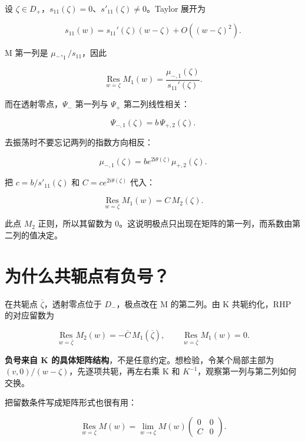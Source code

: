 设 $\zeta{}\in{}D_{+}$，$s_{11}(\zeta{})=0$、$s'_{11}(\zeta{})\ne{}0$。Taylor 展开为\par

\[
s_{11}(w)=s_{11}'(\zeta)(w-\zeta)+O((w-\zeta)^2).
\]

M 第一列是 $\mu{}_{-},_{1}/s_{11}$，因此\par

\[
\operatorname*{Res}_{w=\zeta}M_1(w)
=\dfrac{\mu_{-,1}(\zeta)}{s_{11}'(\zeta)}.
\]

而在透射零点，$\Psi{}_{-}$ 第一列与 $\Psi{}_{+}$ 第二列线性相关：\par

\[
\Psi_{-,1}(\zeta)=b\,\Psi_{+,2}(\zeta).
\]

去振荡时不要忘记两列的指数方向相反：\par

\[
\mu_{-,1}(\zeta)
=b e^{2\mathrm{i}\theta(\zeta)}\mu_{+,2}(\zeta).
\]

把 $c=b/s'_{11}(\zeta{})$ 和 $C=ce^{2i\theta{}(\zeta{})}$ 代入：\par

\[
\boxed{\operatorname*{Res}_{w=\zeta}M_1(w)=C\,M_2(\zeta).}
\]

此点 $M_{2}$ 正则，所以其留数为 0。这说明极点只出现在矩阵的第一列，而系数由第二列的值决定。\par

\section{为什么共轭点有负号？}
\par

在共轭点 $\overline \zeta{}$，透射零点位于 $D_{-}$，极点改在 M 的第二列。由 K 共轭约化，RHP 的对应留数为\par

\[
\operatorname*{Res}_{w=\overline\zeta}M_2(w)
=-\overline C\,M_1(\overline\zeta),
\qquad
\operatorname*{Res}_{w=\overline\zeta}M_1(w)=0.
\]

\textbf{负号来自 K 的具体矩阵结构}，不是任意约定。想检验，令某个局部主部为 $(v,0)/(w-\zeta{})$，先逐项共轭，再左右乘 K 和 $K^{-1}$，观察第一列与第二列如何交换。\par

把留数条件写成矩阵形式也很有用：\par

\[
\operatorname*{Res}_{w=\zeta}M(w)
=\lim\limits_{w\to\zeta}M(w)
\begin{pmatrix}0&0\\C&0\end{pmatrix}.
\]

